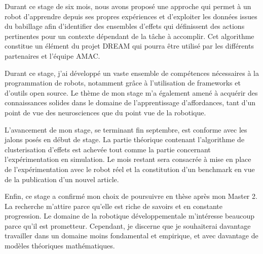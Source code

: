 \documentclass[draft]{llncs}
\begin{document}
Durant ce stage de six mois, nous avons proposé une approche qui permet à un robot d'apprendre depuis ses propres expériences et d'exploiter les données issues du babillage afin d'identifier des ensembles d'effets qui définissent des actions pertinentes pour un contexte dépendant de la tâche à accomplir.
Cet algorithme constitue un élément du projet DREAM qui pourra être utilisé par les différents partenaires et l'équipe AMAC.

Durant ce stage, j'ai développé un vaste ensemble de compétences nécessaires à la programmation de robots, notamment grâce à l'utilisation de frameworks et d'outils open source.
Le thème de mon stage m'a également amené à acquérir des connaissances solides dans le domaine de l'apprentissage d'affordances, tant d'un point de vue des neurosciences que du point vue de la robotique.

L'avancement de mon stage, se terminant fin septembre, est conforme avec les jalons posés en début de stage.
La partie théorique contenant l'algorithme de clusterisation d'effets est achevée tout comme la partie concernant l'expérimentation en simulation.
Le mois restant sera consacrée à mise en place de l'expérimentation avec le robot réel et la constitution d'un benchmark en vue de la publication d'un nouvel article.

Enfin, ce stage a confirmé mon choix de poursuivre en thèse après mon Master 2.
La recherche m'attire parce qu'elle est riche de savoirs et en constante progression.
Le domaine de la robotique développementale m'intéresse beaucoup parce qu'il est prometteur.
Cependant, je discerne que je souhaiterai davantage travailler dans un domaine moins fondamental et empirique, et avec davantage de modèles théoriques mathématiques.




\end{document}
